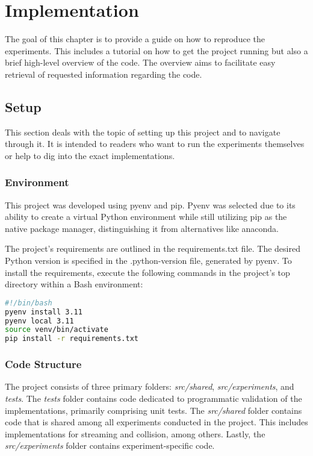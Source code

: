 \chapter{Implementation}\label{ch:implementation}
The goal of this chapter is to provide a guide on how to reproduce the experiments.
This includes a tutorial on how to get the project running but also a brief high-level overview of the code.
The overview aims to facilitate easy retrieval of requested information regarding the code.


\section{Setup}
This section deals with the topic of setting up this project and to navigate through it.
It is intended to readers who want to run the experiments themselves or help to dig into the exact implementations.

\subsection{Environment}
This project was developed using pyenv and pip.
Pyenv was selected due to its ability to create a virtual Python environment while still utilizing pip as the native package manager, distinguishing it from alternatives like anaconda.
\newline

The project's requirements are outlined in the requirements.txt file.
The desired Python version is specified in the .python-version file, generated by pyenv.
To install the requirements, execute the following commands in the project's top directory within a Bash environment:

\begin{center}
    \begin{lstlisting}[language=bash]
#!/bin/bash
pyenv install 3.11
pyenv local 3.11
source venv/bin/activate
pip install -r requirements.txt
    \end{lstlisting}
\end{center}

\subsection{Code Structure}
The project consists of three primary folders: \textit{src/shared}, \textit{src/experiments}, and \textit{tests}.
The \textit{tests} folder contains code dedicated to programmatic validation of the implementations, primarily comprising unit tests.
The \textit{src/shared} folder contains code that is shared among all experiments conducted in the project.
This includes implementations for streaming and collision, among others.
Lastly, the \textit{src/experiments} folder contains experiment-specific code.


